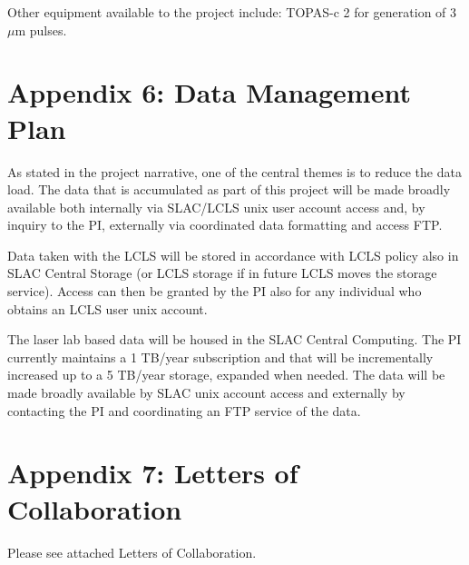 \documentclass[letterpaper,oneside,11pt]{article}
\begin{document}
\noindent Other equipment available to the project include:
TOPAS-c 2 for generation of 3 $\mu$m pulses.

\clearpage
\appendix
\section*{Appendix 6: Data Management Plan}

As stated in the project narrative, one of the central themes is to reduce the data load.
The data that is accumulated as part of this project will be made broadly available both internally via SLAC/LCLS unix user account access and, by inquiry to the PI, externally via coordinated data formatting and access FTP.

Data taken with the LCLS will be stored in accordance with LCLS policy also in SLAC Central Storage (or LCLS storage if in future LCLS moves the storage service).
Access can then be granted by the PI also for any individual who obtains an LCLS user unix account. 

The laser lab based data will be housed in the SLAC Central Computing.  
The PI currently maintains a 1 TB/year subscription and that will be incrementally increased up to a 5 TB/year storage, expanded when needed.
The data will be made broadly available by SLAC unix account access and externally by contacting the PI and coordinating an FTP service of the data.


\clearpage
\appendix
\section*{Appendix 7: Letters of Collaboration}

Please see attached Letters of Collaboration.
\end{document}
